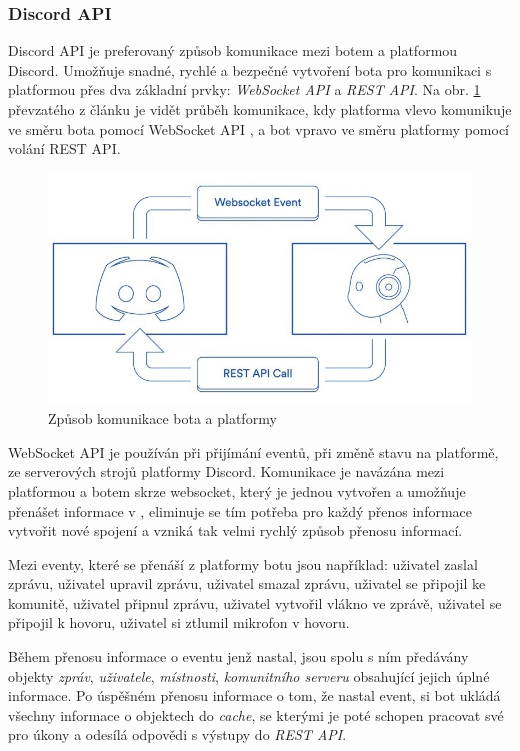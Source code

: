 \documentclass[
  program=inf,
biblatex=false,
sourcecodes=true,
joinlists=true,
  figures=true,
  tables=true,
  glossaries=true,
  index=false
]{kidiplom}
\begin{document}
\subsubsection{Discord API}
Discord API je preferovaný způsob komunikace mezi botem a platformou Discord. Umožňuje snadné, rychlé
a bezpečné vytvoření bota pro komunikaci s platformou přes dva základní prvky:
{\it WebSocket API} a {\it REST API}.
Na obr. \ref{discordapi} převzatého z článku \cite{restapi} je vidět průběh 
komunikace, kdy platforma vlevo komunikuje
ve směru bota pomocí WebSocket API \cite{webapi}, a bot vpravo ve směru platformy pomocí volání REST API. \cite{restapi}

\begin{figure}[h]
  \centering \includegraphics[scale=0.9]{discordapi}
  \caption{\label{discordapi}Způsob komunikace bota a platformy \cite{restapi}}
\end{figure}

WebSocket API je používán při přijímání eventů, při změně stavu na platformě, ze serverových strojů platformy Discord. Komunikace
je navázána mezi platformou a botem skrze websocket, který je jednou vytvořen a umožňuje přenášet informace v 
, eliminuje se tím potřeba pro každý přenos informace vytvořit nové spojení 
a vzniká tak velmi rychlý způsob přenosu informací.

Mezi eventy, které se přenáší z platformy botu jsou například: uživatel zaslal zprávu, uživatel upravil zprávu, uživatel smazal zprávu, 
uživatel se připojil ke komunitě, uživatel připnul zprávu, uživatel vytvořil vlákno ve zprávě, 
uživatel se připojil k hovoru, uživatel si ztlumil mikrofon v hovoru.

Během přenosu informace o eventu jenž nastal, jsou spolu s ním předávány objekty 
{\it zpráv}, {\it uživatele}, {\it místnosti}, {\it komunitního serveru}
obsahující jejich úplné informace. Po úspěšném přenosu informace o tom, že nastal event, si bot ukládá
všechny informace o objektech do {\it cache}, se kterými je poté schopen pracovat své
pro úkony a odesílá odpovědi s výstupy do {\it REST API}.
\end{document}
